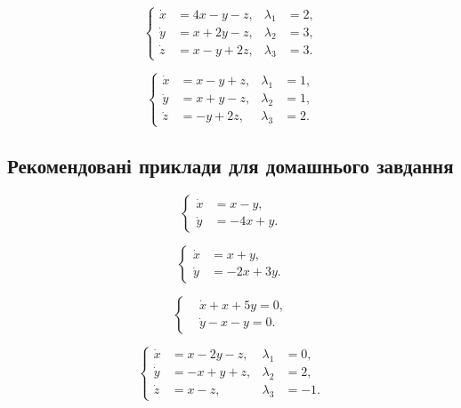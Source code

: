 \begin{problem}
	\[ \left\{ \begin{aligned} \dot x &= 4 x - y - z, & \lambda_1 &= 2, \\ \dot y &= x + 2 y - z, & \lambda_2 &= 3, \\ \dot z &= x - y + 2 z, & \lambda_3 &= 3. \end{aligned} \right. \]
\end{problem}

\begin{problem}
	\[ \left\{ \begin{aligned} \dot x &= x - y + z, & \lambda_1 &= 1, \\ \dot y &= x + y - z, & \lambda_2 &= 1, \\ \dot z &= - y + 2 z, & \lambda_3 &= 2. \end{aligned} \right. \]
\end{problem}

\subsection*{Рекомендовані приклади для домашнього завдання}

\begin{problem}
	\[ \left\{ \begin{aligned} \dot x &= x - y, \\ \dot y &= - 4 x + y. \end{aligned} \right. \]
\end{problem}

\begin{problem}
	\[ \left\{ \begin{aligned} \dot x &= x + y, \\ \dot y &= - 2 x + 3 y. \end{aligned} \right. \]
\end{problem}

\begin{problem}
	\[ \left\{ \begin{aligned} & \dot x + x + 5 y = 0, \\ & \dot y - x - y = 0. \end{aligned} \right. \]
\end{problem}

\begin{problem}
	\[ \left\{ \begin{aligned} \dot x &= x - 2 y - z, & \lambda_1 &= 0, \\ \dot y &= - x + y + z, & \lambda_2 &= 2, \\ \dot z &= x - z, & \lambda_3 &= - 1. \end{aligned} \right. \]
\end{problem}

